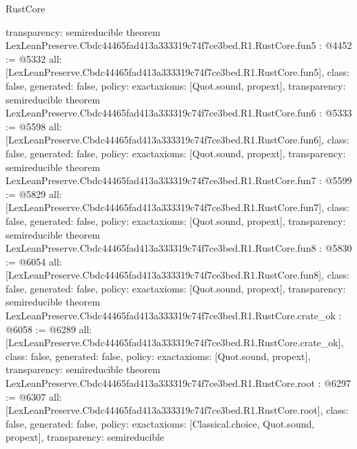 \begin{lexlean}{RustCore}
\begin{coremodule}
{  transparency: semireducible
}
theorem LexLeanPreserve.Cbdc44465fad413a333319c74f7ce3bed.R1.RustCore.fun5 : @4452 := @5332 {
  all: [LexLeanPreserve.Cbdc44465fad413a333319c74f7ce3bed.R1.RustCore.fun5],
  class: false,
  generated: false,
  policy: exact{axioms: [Quot.sound, propext]},
  transparency: semireducible
}
theorem LexLeanPreserve.Cbdc44465fad413a333319c74f7ce3bed.R1.RustCore.fun6 : @5333 := @5598 {
  all: [LexLeanPreserve.Cbdc44465fad413a333319c74f7ce3bed.R1.RustCore.fun6],
  class: false,
  generated: false,
  policy: exact{axioms: [Quot.sound, propext]},
  transparency: semireducible
}
theorem LexLeanPreserve.Cbdc44465fad413a333319c74f7ce3bed.R1.RustCore.fun7 : @5599 := @5829 {
  all: [LexLeanPreserve.Cbdc44465fad413a333319c74f7ce3bed.R1.RustCore.fun7],
  class: false,
  generated: false,
  policy: exact{axioms: [Quot.sound, propext]},
  transparency: semireducible
}
theorem LexLeanPreserve.Cbdc44465fad413a333319c74f7ce3bed.R1.RustCore.fun8 : @5830 := @6054 {
  all: [LexLeanPreserve.Cbdc44465fad413a333319c74f7ce3bed.R1.RustCore.fun8],
  class: false,
  generated: false,
  policy: exact{axioms: [Quot.sound, propext]},
  transparency: semireducible
}
theorem LexLeanPreserve.Cbdc44465fad413a333319c74f7ce3bed.R1.RustCore.crate_ok : @6058 := @6289 {
  all: [LexLeanPreserve.Cbdc44465fad413a333319c74f7ce3bed.R1.RustCore.crate_ok],
  class: false,
  generated: false,
  policy: exact{axioms: [Quot.sound, propext]},
  transparency: semireducible
}
theorem LexLeanPreserve.Cbdc44465fad413a333319c74f7ce3bed.R1.RustCore.root : @6297 := @6307 {
  all: [LexLeanPreserve.Cbdc44465fad413a333319c74f7ce3bed.R1.RustCore.root],
  class: false,
  generated: false,
  policy: exact{axioms: [Classical.choice, Quot.sound, propext]},
  transparency: semireducible
}


\end{coremodule}
\end{lexlean}
